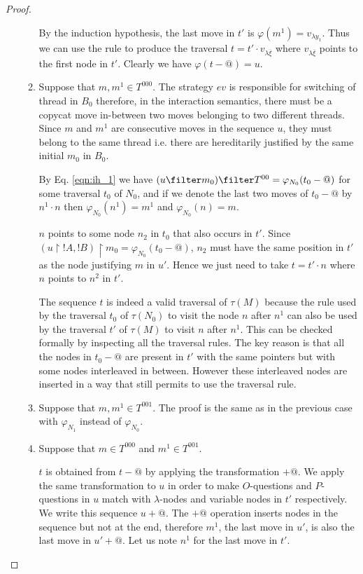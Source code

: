 \begin{proof}
\begin{itemize}
\begin{enumerate}
    By the induction hypothesis, the last move in $t'$ is $\varphi(m^1) = v_{\lambda y_1}$.
    Thus we can use the rule  to produce
    the traversal $t = t' \cdot v_{\lambda \overline{\xi}}$ where $v_{\lambda
    \overline{\xi}}$ points to the first node in $t'$.
    Clearly we have $\varphi(t-@) = u$.

    \item Suppose that $m,m^1 \in T^{000}$.
    The strategy $ev$ is responsible for switching of thread
    in $B_0$ therefore, in the interaction semantics, there
    must be a copycat move in-between two moves belonging to
    two different threads. Since $m$ and $m^1$ are
    consecutive moves in the sequence $u$, they must belong
    to the same thread i.e. there are hereditarily justified
    by the same initial $m_0$ in $B_0$.


    By Eq. \ref{eqn:ih_1} we have $(u  \filter m_0) \filter
    T^{00} = \varphi_{N_0}(t_0-@)$ for some traversal $t_0$
    of $N_0$, and if we denote the last two moves of $t_0-@$
    by $n^1 \cdot n$ then $\varphi_{N_0}(n^1) = m^1$ and
    $\varphi_{N_0}(n) = m$.

    $n$ points to some node $n_2$ in $t_0$ that also occurs
    in $t'$. Since $(u \upharpoonright !A,
    !B)\upharpoonright m_0 = \varphi_{N_0}(t_0-@)$, $n_2$
    must have the same position in $t'$ as the node
    justifying $m$ in $u'$. Hence we just need to take $t =
    t' \cdot n$ where $n$ points to $n^2$ in $t'$.

    The sequence $t$ is indeed a valid traversal of $\tau(M)$
    because the rule used by the traversal $t_0$
    of $\tau(N_0)$ to visit the node $n$ after $n^1$ can also be used by the traversal $t'$ of $\tau(M)$
    to visit $n$ after $n^1$.
    This can be checked formally by inspecting all the traversal rules. The key reason is that
    all the nodes in $t_0-@$ are present in $t'$ with the same pointers but with some nodes interleaved in between.
    However these interleaved nodes are inserted in a way that still permits to use the traversal rule.

    \item Suppose that $m,m^1 \in T^{001}$.
    The proof is the same as in the previous case with
    $\varphi_{N_1}$ instead of $\varphi_{N_0}$.

    \item Suppose that $m \in T^{000}$ and $m^1 \in T^{001}$.

    $t$ is obtained from $t-@$ by applying the
    transformation $+@$. We apply the same transformation to
    $u$ in order to make $O$-questions and $P$-questions in
    $u$ match with $\lambda$-nodes and variable nodes in
    $t'$ respectively. We write this sequence $u+@$. The
    $+@$ operation inserts nodes in the sequence but not at
    the end, therefore $m^1$, the last move in $u'$, is also
    the last move in $u'+@$. Let us note $n^1$ for the last
    move in $t'$.


\end{enumerate}
\end{itemize}
\end{proof}
